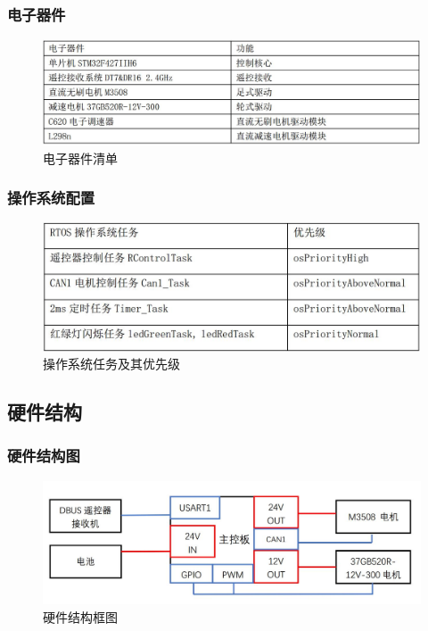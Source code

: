 \documentclass[12pt]{article}
\begin{document}
\begin{CJK}{UTF8}{gbsn}
\subsubsection{电子器件}
 \begin{figure}[H]
\centering
\includegraphics[width=.9\textwidth]{chap5//fig2.jpg}
\caption{电子器件清单}
\end{figure}
\subsubsection{操作系统配置}
 \begin{figure}[H]
\centering
\includegraphics[width=.77\textwidth]{chap5//fig3.jpg}
\caption{操作系统任务及其优先级}
\end{figure}

\subsection{硬件结构}
\subsubsection{硬件结构图}
 \begin{figure}[H]
\centering
\includegraphics[width=.95\textwidth]{chap5//fig4.jpg}
\caption{硬件结构框图}
\end{figure}

\end{CJK}
\end{document}
